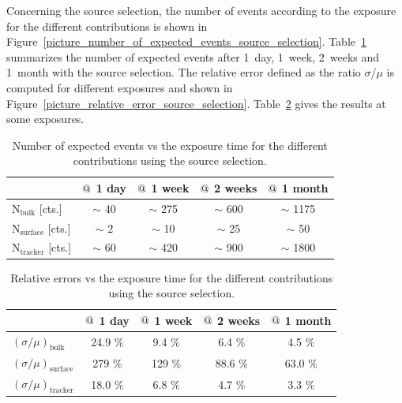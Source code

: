 \documentclass[main.tex]{subfiles}
\begin{document}
\NI Concerning the source selection, the number of events according to the exposure for the different contributions is shown in Figure~\ref{picture_number_of_expected_events_source_selection}. Table~\ref{table_number_of_expected_events_source_selection} summarizes the number of expected events after 1~day, 1~week, 2~weeks and 1~month with the source selection. The relative error defined as the ratio $\sigma$/$\mu$ is computed for different exposures and shown in Figure~\ref{picture_relative_error_source_selection}. Table~\ref{table_relative_error_source_selection} gives the results at some exposures.


\begin{table}[h!]
\begin{center}
\begin{tabular}{l|c|c|c|c}
 & $\symbol{64}$ 1 day  & $\symbol{64}$ 1 week  & $\symbol{64}$ 2 weeks & $\symbol{64}$ 1 month  \\
\hline
$\text{N}_\text{bulk}$ [cts.]    & $\sim$ 40 & $\sim$ 275  & $\sim$ 600 & $\sim$ 1175 \\
$\text{N}_\text{surface}$ [cts.] & $\sim$ 2  & $\sim$ 10   & $\sim$ 25  & $\sim$ 50   \\
$\text{N}_\text{tracker}$ [cts.] & $\sim$ 60 & $\sim$ 420  & $\sim$ 900 & $\sim$ 1800 \\
\hline
\end{tabular}
\end{center}
\caption{Number of expected events vs the exposure time for the different contributions using the source selection.}
\label{table_number_of_expected_events_source_selection}
\end{table}


\begin{table}[h!]
\begin{center}
\begin{tabular}{l|c|c|c|c}
      & $\symbol{64}$ 1 day  & $\symbol{64}$ 1 week  & $\symbol{64}$ 2 weeks & $\symbol{64}$ 1 month  \\
\hline
$(\sigma / \mu)_{\text{bulk}}$    & 24.9 \% & 9.4  \% & 6.4  \% & 4.5  \% \\
$(\sigma / \mu)_{\text{surface}}$ & 279  \% & 129  \% & 88.6 \% & 63.0 \% \\
$(\sigma / \mu)_{\text{tracker}}$ & 18.0 \% & 6.8  \% & 4.7  \% & 3.3  \% \\
\hline
\end{tabular}
\end{center}
\caption{Relative errors vs the exposure time for the different contributions using the source selection.}
\label{table_relative_error_source_selection}
\end{table}
\end{document}

